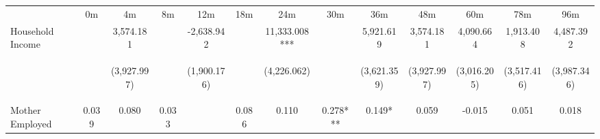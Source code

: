 \begin{tabular}{lcccccccccccc}
\hline \noalign{\smallskip} & 0m & 4m & 8m & 12m & 18m & 24m & 30m & 36m & 48m & 60m & 78m & 96m\\
\noalign{\smallskip}\hline \noalign{\smallskip}Household Income &  & 3,574.181 &  & -2,638.942 &  & 11,333.008*** &  & 5,921.619 & 3,574.181 & 4,090.664 & 1,913.408 & 4,487.392\\
 & \begin{footnotesize}\end{footnotesize} & \begin{footnotesize}(3,927.997)\end{footnotesize} & \begin{footnotesize}\end{footnotesize} & \begin{footnotesize}(1,900.176)\end{footnotesize} & \begin{footnotesize}\end{footnotesize} & \begin{footnotesize}(4,226.062)\end{footnotesize} & \begin{footnotesize}\end{footnotesize} & \begin{footnotesize}(3,621.359)\end{footnotesize} & \begin{footnotesize}(3,927.997)\end{footnotesize} & \begin{footnotesize}(3,016.205)\end{footnotesize} & \begin{footnotesize}(3,517.416)\end{footnotesize} & \begin{footnotesize}(3,987.346)\end{footnotesize}\\
\noalign{\smallskip}Mother Employed & 0.039 & 0.080 & 0.033 &  & 0.086 & 0.110 & 0.278*** & 0.149* & 0.059 & -0.015 & 0.051 & 0.018\\

\end{tabular}
